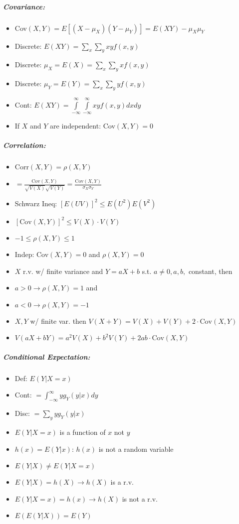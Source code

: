 \documentclass[landscape,10pt]{article}
\begin{document}
\begin{multicols}{4}
\subparagraph*{Covariance: }
\begin{itemize}
    \item[] Cov\((X,Y) = E[(X-\mu_X)(Y-\mu_Y)] = E(XY) - \mu_X\mu_Y\)
    \item[] Discrete: \(E(XY) = \sum\limits_x\sum\limits_yxyf(x,y)\)
    \item[] Discrete: \(\mu_X = E(X) = \sum\limits_x\sum\limits_yxf(x,y)\)
    \item[] Discrete: \(\mu_Y = E(Y) = \sum\limits_x\sum\limits_yyf(x,y)\)
    \item[] Cont: \(E(XY) = \int\limits_{-\infty}^{\infty}\int\limits_{-\infty}^{\infty}{xyf(x,y)dxdy}\)
    \item[] If \(X\) and \(Y\) are independent: Cov\((X,Y) = 0\)
\end{itemize}
\subparagraph*{Correlation: }
\begin{itemize}
    \item[] Corr\((X,Y) = \rho(X,Y)\)
    \item[] \(= \frac{\text{Cov}(X,Y)}{\sqrt{V(X)}\sqrt{V(Y)}} =\frac{\text{Cov}(X,Y)}{\sigma_X \sigma_Y}\)
    \item[] Schwarz Ineq: \([E(UV)]^2 \leq E(U^2)E(V^2)\)
    \item[] \([\text{Cov}(X,Y)]^2 \leq V(X) \cdot V(Y)\)
    \item[] \( -1 \leq \rho(X,Y) \leq 1\)
    \item[] Indep: Cov\((X,Y) = 0\) and \(\rho(X,Y) = 0\)
    \item[] \(X\) r.v. w/ finite variance and \(Y = aX+b\) s.t. \(a \neq 0, a,b,\) constant, then
    \item[] \(a > 0 \rightarrow \rho(X,Y) = 1\) and
    \item[] \(a < 0 \rightarrow \rho(X,Y) = -1\)
    \item[] \(X,Y\) w/ finite var. then \(V(X+Y) = V(X)+V(Y) + 2\cdot \text{Cov}(X,Y)\)
    \item[] \(V(aX + bY) = a^2 V(X) + b^2 V(Y) + 2ab\cdot\text{Cov}(X,Y)\)
\end{itemize}

\subparagraph*{Conditional Expectation:}
\begin{itemize}
    \item[] Def: \(E(Y|X=x)\)
    \item[] Cont: \(= \int_{-\infty}^{\infty}{y g_Y(y|x)dy}\)
    \item[] Disc: \(= \sum_{y}{y g_Y(y|x)}\)
    \item[] \(E(Y|X=x)\) is a function of \(x\) not \(y\)
    \item[] \(h(x) = E(Y|x)\): \(h(x)\) is not a random variable
    \item[] \(E(Y|X) \neq E(Y|X=x)\)
    \item[] \(E(Y|X) = h(X) \rightarrow h(X)\) is a r.v.
    \item[] \(E(Y|X=x) = h(x) \rightarrow h(X)\) is not a r.v.
    \item[] \(E(E(Y|X)) = E(Y)\)
\end{itemize}


\end{multicols}
\end{document}
